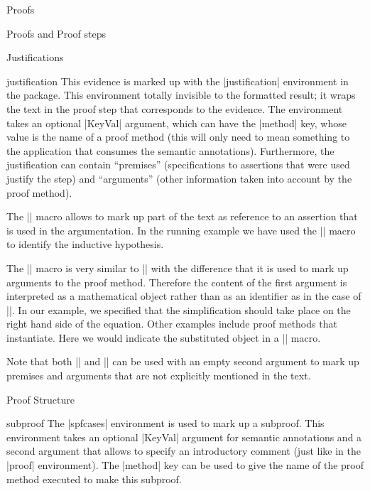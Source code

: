 \begin{sfragment}{Proofs}
\begin{sfragment}{Proofs and Proof steps}
\end{sfragment}

\begin{sfragment}{Justifications}

  \begin{environment}{justification}
    This evidence is marked up with the |justification| environment in the
     package. This environment totally invisible to the formatted result;
    it wraps the text in the proof step that corresponds to the evidence. The environment
    takes an optional |KeyVal| argument, which can have the |method| key, whose value is
    the name of a proof method (this will only need to mean something to the application
    that consumes the semantic annotations). Furthermore, the justification can contain
    ``premises'' (specifications to assertions that were used justify the step) and
    ``arguments'' (other information taken into account by the proof method).
  \end{environment}
  
  \begin{function}{\premise}
    The |\premise| macro allows to mark up part of the text as reference to an assertion
    that is used in the argumentation. In the running example we have used the |\premise|
    macro to identify the inductive hypothesis.
  \end{function}
  
  \begin{function}{\justarg}
    The |\justarg| macro is very similar to |\premise| with the difference that it is used
    to mark up arguments to the proof method. Therefore the content of the first argument
    is interpreted as a mathematical object rather than as an identifier as in the case of
    |\premise|. In our example, we specified that the simplification should take place on
    the right hand side of the equation. Other examples include proof methods that
    instantiate. Here we would indicate the substituted object in a |\justarg| macro.
  \end{function}

  Note that both |\premise| and |\justarg| can be used with an empty second argument to
  mark up premises and arguments that are not explicitly mentioned in the text.
\end{sfragment}

\begin{sfragment}{Proof Structure}

  \begin{environment}{subproof}
    The |spfcases| environment is used to mark up a subproof. This environment takes an
    optional |KeyVal| argument for semantic annotations and a second argument that allows
    to specify an introductory comment (just like in the |proof| environment). The
    |method| key can be used to give the name of the proof method
    executed to make this subproof.
  \end{environment}
  

\end{sfragment}
\end{sfragment}
